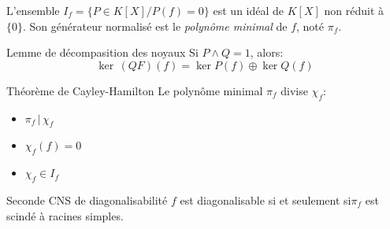 \documentclass[french, a4paper, 11pt, twocolumn]{article}
\newcommand{\ssi}{si et seulement si\xspace}		%
\newcommand{\co}{\left[}         %
\newcommand{\cf}{\right]}        %
\newcommand{\cof}[1]{\co #1 \cf} %
\begin{document}
\begin{definition}
  L'ensemble $I_{f}=\lbrace P\in K\cof{X} \slash P(f)=0\rbrace$ est un idéal de $K\cof{X}$ non réduit à $\lbrace 0 \rbrace$. Son générateur normalisé est le \emph{polynôme minimal} de $f$, noté $\pi_{f}$.
\end{definition}

\begin{theoreme}{Lemme de décompasition des noyaux}
  Si $P\wedge Q = 1$, alors:
  \[\ker\, (QF)(f) = \ker P(f)\oplus \ker Q(f)\]
\end{theoreme}

\begin{theoreme}{Théorème de Cayley-Hamilton}
  Le polynôme minimal $\pi_{f}$ divise $\chi_{f}$:
  \begin{itemize}[label=$\bullet$]
    \item $\pi_{f}\,|\,\chi_{f}$
    \item $\chi_{f}(f) = 0$
    \item $\chi_{f} \in I_{f}$
  \end{itemize}
\end{theoreme}

\begin{theoreme}{Seconde CNS de diagonalisabilité}
  $f$ est diagonalisable \ssi $\pi_{f}$ est scindé à racines simples.
\end{theoreme}
\end{document}
